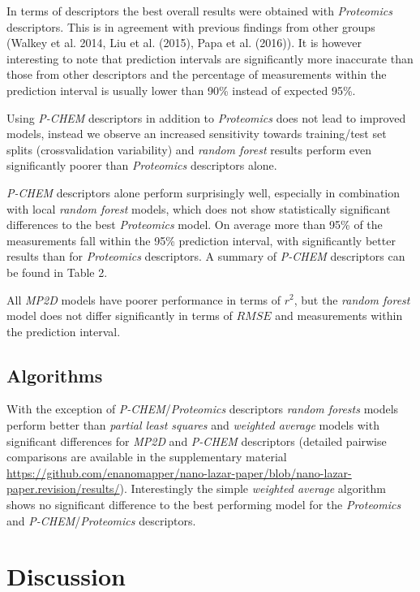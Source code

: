 \documentclass[utf8]{frontiersHLTH} %
\begin{document}
In terms of descriptors the best overall results were obtained with
\emph{Proteomics} descriptors. This is in agreement with previous
findings from other groups (Walkey et al. 2014, Liu et al. (2015), Papa
et al. (2016)). It is however interesting to note that prediction
intervals are significantly more inaccurate than those from other
descriptors and the percentage of measurements within the prediction
interval is usually lower than 90\% instead of expected 95\%.

Using \emph{P-CHEM} descriptors in addition to \emph{Proteomics} does
not lead to improved models, instead we observe an increased sensitivity
towards training/test set splits (crossvalidation variability) and
\emph{random forest} results perform even significantly poorer than
\emph{Proteomics} descriptors alone.

\emph{P-CHEM} descriptors alone perform surprisingly well, especially in
combination with local \emph{random forest} models, which does not show
statistically significant differences to the best \emph{Proteomics}
model. On average more than 95\% of the measurements fall within the
95\% prediction interval, with significantly better results than for
\emph{Proteomics} descriptors. A summary of \emph{P-CHEM} descriptors
can be found in Table 2.

All \emph{MP2D} models have poorer performance in terms of \(r^2\), but
the \emph{random forest} model does not differ significantly in terms of
\(RMSE\) and measurements within the prediction interval.

\subsection{Algorithms}\label{algorithms-1}

With the exception of \emph{P-CHEM}/\emph{Proteomics} descriptors
\emph{random forests} models perform better than \emph{partial least
squares} and \emph{weighted average} models with significant differences
for \emph{MP2D} and \emph{P-CHEM} descriptors (detailed pairwise
comparisons are available in the supplementary material
\url{https://github.com/enanomapper/nano-lazar-paper/blob/nano-lazar-paper.revision/results/}).
Interestingly the simple \emph{weighted average} algorithm shows no
significant difference to the best performing model for the
\emph{Proteomics} and \emph{P-CHEM}/\emph{Proteomics} descriptors.

\section{Discussion}\label{discussion}
\end{document}
